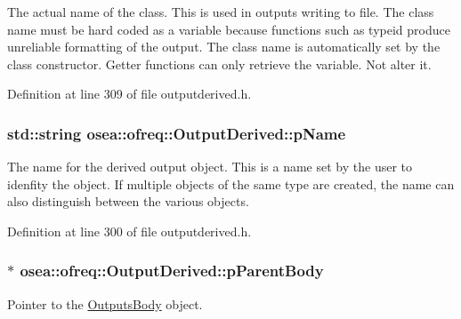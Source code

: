 The actual name of the class. This is used in outputs writing to file. The class name must be hard coded as a variable because functions such as typeid produce unreliable formatting of the output. The class name is automatically set by the class constructor. Getter functions can only retrieve the variable. Not alter it. 



Definition at line 309 of file outputderived.\-h.

\hypertarget{classosea_1_1ofreq_1_1_output_derived_a4ab81d265885b1c9fb9b4596dc9cd093}{
\subsubsection[{p\-Name}]{\setlength{\rightskip}{0pt plus 5cm}std\-::string osea\-::ofreq\-::\-Output\-Derived\-::p\-Name\hspace{0.3cm}{\ttfamily [protected]}}}\label{classosea_1_1ofreq_1_1_output_derived_a4ab81d265885b1c9fb9b4596dc9cd093}


The name for the derived output object. This is a name set by the user to idenfity the object. If multiple objects of the same type are created, the name can also distinguish between the various objects. 



Definition at line 300 of file outputderived.\-h.

\hypertarget{classosea_1_1ofreq_1_1_output_derived_a62d01bedaed33feb53c4108eaf8e4baf}{
\subsubsection[{p\-Parent\-Body}]{$\ast$ osea\-::ofreq\-::\-Output\-Derived\-::p\-Parent\-Body\hspace{0.3cm}{\ttfamily [protected]}}}\label{classosea_1_1ofreq_1_1_output_derived_a62d01bedaed33feb53c4108eaf8e4baf}


Pointer to the \hyperlink{classosea_1_1ofreq_1_1_outputs_body}{Outputs\-Body} object. 

